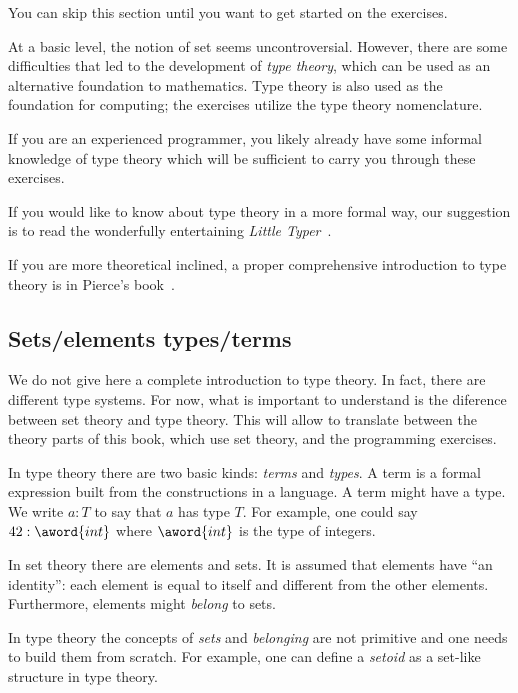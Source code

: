 
\begin{remark}
    You can skip this section until you want to get started on the exercises.
\end{remark}

At a basic level, the notion of set seems uncontroversial.
However, there are some difficulties that led to the development of \emph{type theory},
which can be used as an alternative foundation to mathematics.
Type theory is also used as the foundation for computing; the exercises utilize the type theory nomenclature.

If you are an experienced programmer, you likely already have some informal knowledge of type theory which will be sufficient to carry you through these exercises.

If you would like to know about type theory in a more formal way, our suggestion is to read the wonderfully entertaining \emph{Little Typer}~\cite{friedman2018little}.

If you are more theoretical inclined, a proper comprehensive introduction to type theory is in Pierce's book~\cite{pierce02types}.

\subsection{Sets/elements \vs types/terms}
We do not give here a complete introduction to type theory.
In fact, there are different type systems.
For now, what is important to understand is the diference between set theory and type theory.
This will allow to translate between the theory parts of this book, which use set theory, and the programming exercises.

In type theory there are two basic kinds: \emph{terms} and \emph{types}.
A term is a formal expression built from the constructions in a language.
A term might have a type.
We write $a : T$ to say that $a$ has type $T$.
For example, one could say $42 : \aword{int}$ where $\aword{int}$ is the type of integers.

In set theory there are elements and sets.
It is assumed that elements have ``an identity'': each element is equal to itself and different from the other elements.
Furthermore, elements might \emph{belong} to sets.

In type theory the concepts of \emph{sets} and \emph{belonging} are not primitive and one needs to build them from scratch.
For example, one can define a \emph{setoid} as a set-like structure in type theory.

